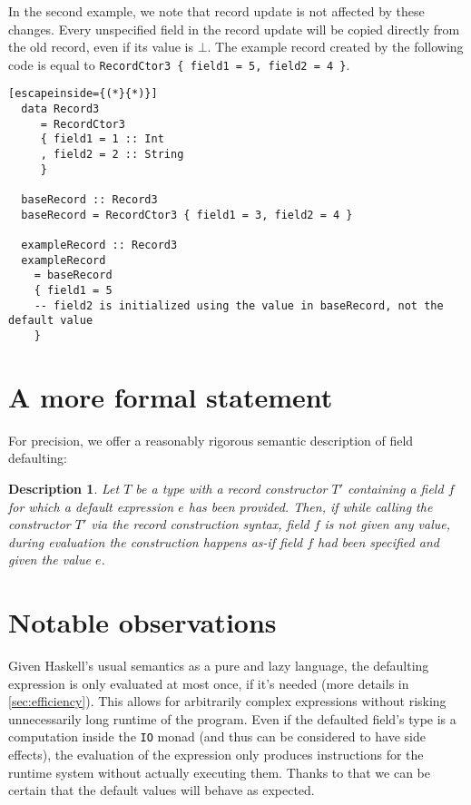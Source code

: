 \documentclass[en]{pracamgr}
\begin{document}
In the second example, we note that record update is not affected by these changes. 
Every unspecified field in the record update will be copied directly from the old record, even if its value is $\bot$.
The example record created by the following code is equal to \texttt{RecordCtor3 \{ field1 = 5, field2 = 4 \}}.

\begin{lstlisting}[escapeinside={(*}{*)}]
  data Record3
     = RecordCtor3
     { field1 = 1 :: Int
     , field2 = 2 :: String
     }  

  baseRecord :: Record3
  baseRecord = RecordCtor3 { field1 = 3, field2 = 4 }

  exampleRecord :: Record3
  exampleRecord 
    = baseRecord
    { field1 = 5
    -- field2 is initialized using the value in baseRecord, not the default value
    }

\end{lstlisting}

\section{A more formal statement}
For precision, we offer a reasonably rigorous semantic description of field defaulting:
\newtheorem{remark}{Description}
\begin{remark}
  \normalfont
  Let $T$ be a type with a record constructor $T'$ containing a field $f$ for which a default expression $e$ has been provided.
  Then, if while calling the constructor $T'$ via the record construction syntax, field $f$ is not given any value, during evaluation the construction happens \textit{as-if} field $f$ had been specified and given the value $e$.
\end{remark}

\section{Notable observations}
Given Haskell's usual semantics as a pure and lazy language, the defaulting expression is only evaluated at most once, if it's needed (more details in \ref{sec:efficiency}).
This allows for arbitrarily complex expressions without risking unnecessarily long runtime of the program. 
Even if the defaulted field's type is a computation inside the \texttt{IO} monad (and thus can be considered to have side effects), the evaluation of the expression only produces instructions for the runtime system without actually executing them.
Thanks to that we can be certain that the default values will behave as expected.
\end{document}
